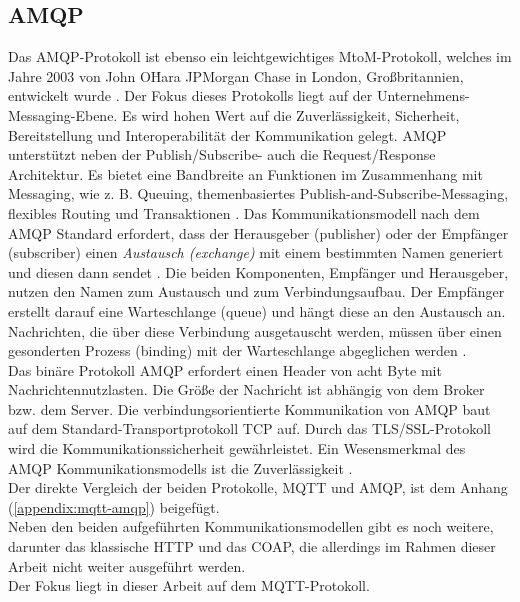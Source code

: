     \subsection{AMQP}
    \label{subsec:amqp}
        Das \ac{AMQP}-Protokoll ist ebenso ein leichtgewichtiges \acs{MtoM}-Protokoll, welches im Jahre 2003 von John O\'Hara JPMorgan Chase 
        in London, Großbritannien, entwickelt wurde \cite{Naik2017}. Der Fokus dieses Protokolls liegt auf der Unternehmens-Messaging-Ebene. 
        Es wird hohen Wert auf die Zuverlässigkeit, Sicherheit, Bereitstellung und Interoperabilität der Kommunikation gelegt. \acs{AMQP} 
        unterstützt neben der Publish/Subscribe- auch die Request/Response Architektur. Es bietet eine Bandbreite an 
        Funktionen im Zusammenhang mit Messaging, wie z. B. Queuing, themenbasiertes Publish-and-Subscribe-Messaging, 
        flexibles Routing und Transaktionen \cite{Naik2017}. Das Kommunikationsmodell nach dem \acs{AMQP} Standard erfordert, dass der 
        Herausgeber (publisher) oder der Empfänger (subscriber) einen \textit{Austausch (exchange)} mit einem bestimmten Namen generiert 
        und diesen dann sendet \cite{Naik2017}. Die beiden Komponenten, Empfänger und Herausgeber, nutzen den Namen zum Austausch und zum 
        Verbindungsaufbau. Der Empfänger erstellt darauf eine Warteschlange (queue) und hängt diese an den Austausch an. Nachrichten, die 
        über diese Verbindung ausgetauscht werden, müssen über einen gesonderten Prozess (binding) mit der Warteschlange abgeglichen werden 
        \cite{Naik2017}.
        \\ 
        Das binäre Protokoll \acs{AMQP} erfordert einen Header von acht Byte mit Nachrichtennutzlasten. Die Größe der Nachricht ist abhängig 
        von dem Broker bzw. dem Server. Die verbindungsorientierte Kommunikation von \acs{AMQP} baut auf dem Standard-Transportprotokoll 
        \acs{TCP} auf. Durch das \acs{TLS}/\acs{SSL}-Protokoll wird die Kommunikationssicherheit gewährleistet. Ein Wesensmerkmal des \acs{AMQP} 
        Kommunikationsmodells ist die Zuverlässigkeit \cite{Naik2017}. 
        \\
        \linebreak
        Der direkte Vergleich der beiden Protokolle, \acs{MQTT} und \acs{AMQP}, ist dem Anhang (\ref{appendix:mqtt-amqp}) beigefügt.
        \\
        \linebreak
        Neben den beiden aufgeführten Kommunikationsmodellen gibt es noch weitere, darunter das klassische \ac{HTTP} und das \ac{COAP}, die allerdings 
        im Rahmen dieser Arbeit nicht weiter ausgeführt werden. 
        \\
        \linebreak
        Der Fokus liegt in dieser Arbeit auf dem \acs{MQTT}-Protokoll. 

